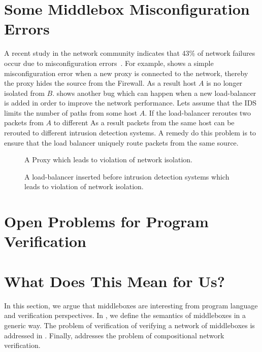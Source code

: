 \section{Some Middlebox Misconfiguration Errors}

A recent study in the network community indicates that 43\% of network failures occur due to misconfiguration errors~\cite{IMC:RJ13}.
For example,  shows a simple misconfiguration error when a new proxy is connected to the network, thereby
the proxy hides the source from the Firewall.
As a result host $A$ is no longer isolated from $B$.
 shows another bug which can happen when a new load-balancer is added in order to improve the network performance.
Lets assume that the IDS limits the number of paths from some host $A$.
If the load-balancer reroutes two packets from $A$ to different
As a result packets from the same host can be rerouted to different intrusion detection systems.
A remedy do this problem is to ensure that the load balancer uniquely route packets from the same source.
\begin{figure}
\caption{\label{fi:Miss1}%
A Proxy which leads to violation of network isolation.}
\end{figure}


\begin{figure}
\caption{\label{fi:LoadIDS}%
A load-balancer inserted before intrusion detection systems which leads to violation of network isolation.}
\end{figure}

\section{Open Problems for Program Verification}
\section{What Does This Mean for Us?}
\label{sec:PL}

In this section, we argue that middleboxes are interesting from program language and verification perspectives.
In , we define the semantics of middleboxes in a generic way.
The problem of verification of verifying a network of middleboxes is addressed in .
Finally,  addresses the problem of compositional network verification.


